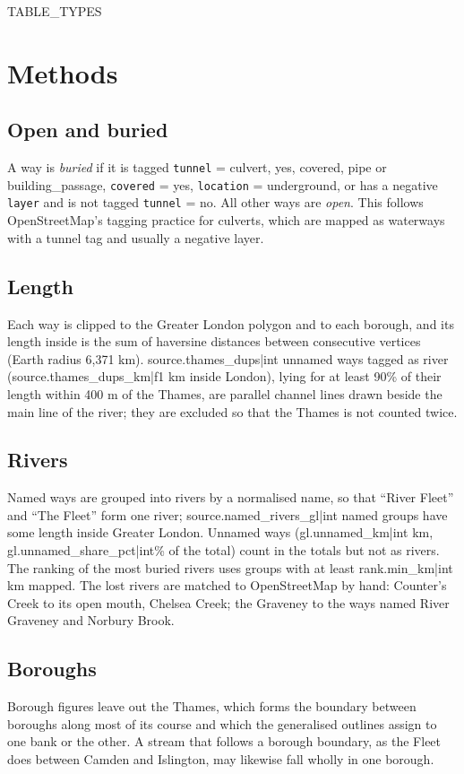 \documentclass[11pt,a4paper]{article}
\begin{document}
{{TABLE_TYPES}}

\section{Methods}
\subsection{Open and buried}
A way is \emph{buried} if it is tagged \texttt{tunnel} = culvert, yes, covered, pipe or building\_passage, \texttt{covered} = yes, \texttt{location} = underground, or has a negative \texttt{layer} and is not tagged \texttt{tunnel} = no. All other ways are \emph{open}. This follows OpenStreetMap's tagging practice for culverts, which are mapped as waterways with a tunnel tag and usually a negative layer.

\subsection{Length}
Each way is clipped to the Greater London polygon and to each borough, and its length inside is the sum of haversine distances between consecutive vertices (Earth radius 6,371 km). {{source.thames_dups|int}} unnamed ways tagged as river ({{source.thames_dups_km|f1}} km inside London), lying for at least 90\% of their length within 400 m of the Thames, are parallel channel lines drawn beside the main line of the river; they are excluded so that the Thames is not counted twice.

\subsection{Rivers}
Named ways are grouped into rivers by a normalised name, so that ``River Fleet'' and ``The Fleet'' form one river; {{source.named_rivers_gl|int}} named groups have some length inside Greater London. Unnamed ways ({{gl.unnamed_km|int}} km, {{gl.unnamed_share_pct|int}}\% of the total) count in the totals but not as rivers. The ranking of the most buried rivers uses groups with at least {{rank.min_km|int}} km mapped. The lost rivers are matched to OpenStreetMap by hand: Counter's Creek to its open mouth, Chelsea Creek; the Graveney to the ways named River Graveney and Norbury Brook.

\subsection{Boroughs}
Borough figures leave out the Thames, which forms the boundary between boroughs along most of its course and which the generalised outlines assign to one bank or the other. A stream that follows a borough boundary, as the Fleet does between Camden and Islington, may likewise fall wholly in one borough.
\end{document}
